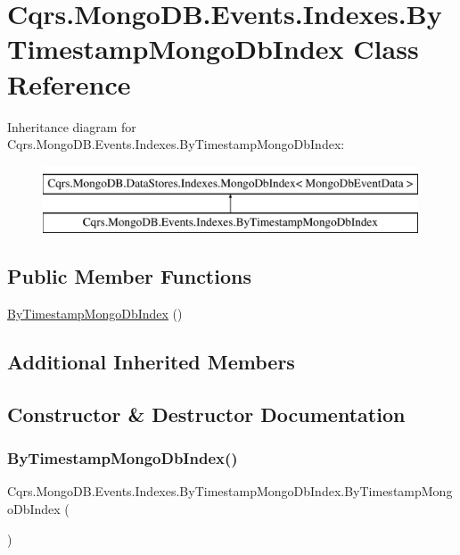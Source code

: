 \hypertarget{classCqrs_1_1MongoDB_1_1Events_1_1Indexes_1_1ByTimestampMongoDbIndex}{}\section{Cqrs.\+Mongo\+D\+B.\+Events.\+Indexes.\+By\+Timestamp\+Mongo\+Db\+Index Class Reference}
\label{classCqrs_1_1MongoDB_1_1Events_1_1Indexes_1_1ByTimestampMongoDbIndex}
Inheritance diagram for Cqrs.\+Mongo\+D\+B.\+Events.\+Indexes.\+By\+Timestamp\+Mongo\+Db\+Index\+:\begin{figure}[H]
\begin{center}
\leavevmode
\includegraphics[height=2.000000cm]{classCqrs_1_1MongoDB_1_1Events_1_1Indexes_1_1ByTimestampMongoDbIndex}
\end{center}
\end{figure}
\subsection*{Public Member Functions}
\begin{DoxyCompactItemize}
\item 
\hyperlink{classCqrs_1_1MongoDB_1_1Events_1_1Indexes_1_1ByTimestampMongoDbIndex_a642c97e253eaa259cb64b627701540c0}{By\+Timestamp\+Mongo\+Db\+Index} ()
\end{DoxyCompactItemize}
\subsection*{Additional Inherited Members}


\subsection{Constructor \& Destructor Documentation}
\mbox{\label{classCqrs_1_1MongoDB_1_1Events_1_1Indexes_1_1ByTimestampMongoDbIndex_a642c97e253eaa259cb64b627701540c0}} 
\subsubsection{\texorpdfstring{By\+Timestamp\+Mongo\+Db\+Index()}{ByTimestampMongoDbIndex()}}
{\footnotesize\ttfamily Cqrs.\+Mongo\+D\+B.\+Events.\+Indexes.\+By\+Timestamp\+Mongo\+Db\+Index.\+By\+Timestamp\+Mongo\+Db\+Index (\begin{DoxyParamCaption}{ }\end{DoxyParamCaption})}


